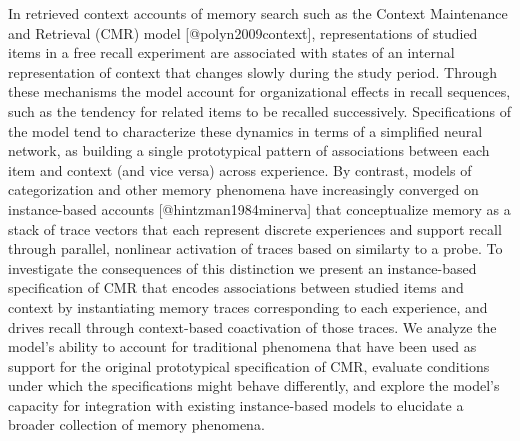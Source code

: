 In retrieved context accounts of memory search such as the Context Maintenance and Retrieval (CMR) model [@polyn2009context], representations of studied items in a free recall experiment are associated with states of an internal representation of context that changes slowly during the study period. Through these mechanisms the model account for organizational effects in recall sequences, such as the tendency for related items to be recalled successively. Specifications of the model tend to characterize these dynamics in terms of a simplified neural network, as building a single prototypical pattern of associations between each item and context (and vice versa) across experience. By contrast, models of categorization and other memory phenomena have increasingly converged on instance-based accounts [@hintzman1984minerva] that conceptualize memory as a stack of trace vectors that each represent discrete experiences and support recall through parallel, nonlinear activation of traces based on similarty to a probe. To investigate the consequences of this distinction we present an instance-based specification of CMR that encodes associations between studied items and context by instantiating memory traces corresponding to each experience, and drives recall through context-based coactivation of those traces. We analyze the model's ability to account for traditional phenomena that have been used as support for the original prototypical specification of CMR, evaluate conditions under which the specifications might behave differently, and explore the model's capacity for integration with existing instance-based models to elucidate a broader collection of memory phenomena.\markdownRendererInterblockSeparator
{}\relax